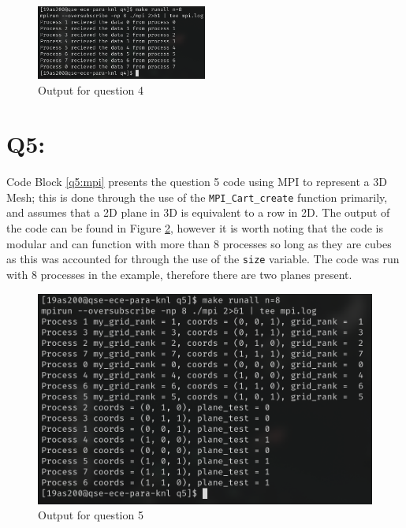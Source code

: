 \documentclass[11pt]{article}
\begin{document}


\begin{figure}[H]
\centering
    \includegraphics[width=0.5\textwidth]{./images/q4.png}
\caption{Output for question 4}
\label{fig:q4}
\end{figure}

\newpage

\section*{Q5:}

Code Block \ref{q5:mpi} presents the question 5 code using MPI to represent a 3D Mesh; this is done through the use of the \texttt{MPI\_Cart\_create} function primarily, and assumes that a 2D plane in 3D is equivalent to a row in 2D.
The output of the code can be found in Figure \ref{fig:q5}, however it is worth noting that the code is modular and can function with more than 8 processes so long as they are cubes as this was accounted for through the use of the \texttt{size} variable.
The code was run with 8 processes in the example, therefore there are two planes present.



\begin{figure}[H]
\centering
    \includegraphics[width=\textwidth]{./images/q5.png}
\caption{Output for question 5}
\label{fig:q5}
\end{figure}
\end{document}
